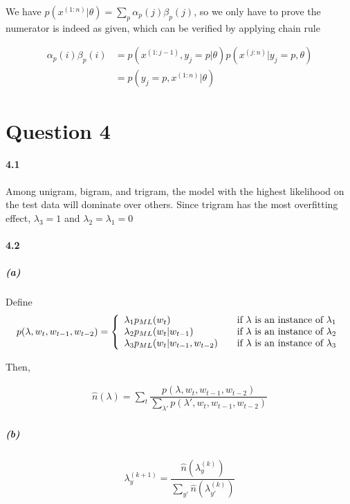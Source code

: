\documentclass[10pt,letter]{article}
\begin{document}
We have $ p(x^{(1:n)} | \theta) = \sum_{p} \alpha_p(j) \beta_p(j) $, so we only have to prove the numerator is indeed as given, which can be verified by applying chain rule

\begin{align*}
\alpha_p(i)\beta_p(i) &= p( x^{(1:j-1)} , y_j = p | \theta) p( x^{(j:n)} |y_j=p, \theta ) \\
&= p(y_j=p , x^{(1:n)}| \theta )
\end{align*}





\section*{Question 4}

\paragraph*{4.1}
Among unigram, bigram, and trigram, the model with the highest likelihood on the test data will dominate over others. Since trigram has the most overfitting effect, $\lambda_3 = 1$ and $\lambda_2 = \lambda_1 = 0$

\paragraph*{4.2}
\subparagraph{(a)}

Define
\begin{align*} 
p( \lambda, w_t, w_{t-1}, w_{t-2} ) = \left\{ 
\begin{array}{l l}
\lambda_1 p_{ML}(w_t) & \quad \text{if $\lambda \text{ is an instance of } \lambda_1$}\\
\lambda_2 p_{ML}(w_t| w_{t-1}) & \quad \text{if $\lambda \text{ is an instance of }  \lambda_2$}\\
\lambda_3 p_{ML}(w_t| w_{t-1}, w_{t-2}) & \quad \text{if $\lambda \text{ is an instance of } \lambda_3$}
\end{array} \right.
\end{align*}

Then, 

\begin{align*}
\hat{n}(\lambda) = \sum_{t} \dfrac{ p( \lambda, w_t, w_{t-1}, w_{t-2} ) }{ \sum_{\lambda '} p( \lambda ', w_t, w_{t-1}, w_{t-2} ) }
\end{align*}

\subparagraph{(b)}
\begin{align*}
\lambda^{(k+1)}_y = \dfrac{ \hat{n}(\lambda_y^{(k)}) }{ \sum_{y'} \hat{n}(\lambda_{y'}^{(k)})           }
\end{align*}
\end{document}
